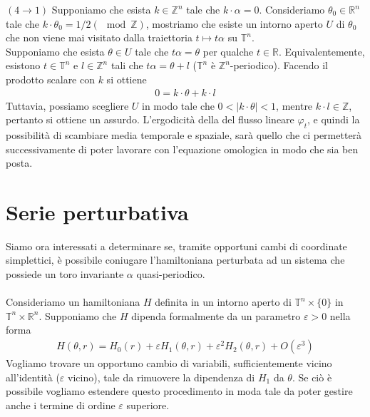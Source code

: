 \documentclass[twoside, 11pt]{amsbook}
\makeatletter
\newcommand{\0}{{(0)}}
\newcommand{\3}{{(3)}}
\theoremstyle{colonplain}
\theoremstyle{colondefinition}
\theoremstyle{colonremark}
\numberwithin{equation}{chapter}
\renewcommand{\proofname}{Dimostrazione}
\renewenvironment{proof}[1][\proofname]{\par
  \pushQED{\qed}%
  \normalfont \topsep6\p@\@plus6\p@\relax
  \trivlist
  \item[\hskip\labelsep\bfseries #1:]\ignorespaces
}{%
  \popQED\endtrivlist\@endpefalse
}
\makeatother
\begin{document}
\begin{proof}
$(4 \rightarrow 1)$ Supponiamo che esista $k \in \mathbb{Z}^n$ tale che $k \cdot \alpha = 0$. Consideriamo $\theta_0 \in \mathbb{R}^n$ tale che $k \cdot \theta_0 = 1/2 (\mod \mathbb{Z})$, mostriamo che esiste un intorno aperto $U$ di $\theta_0$ che non viene mai visitato dalla traiettoria $t \mapsto t\alpha$ su $\mathbb{T}^n$. \\
Supponiamo che esista $\theta \in U$ tale che $t\alpha = \theta$ per qualche $t \in \mathbb{R}$. Equivalentemente, esistono $t \in \mathbb{T}^n$ e $l \in \mathbb{Z}^n$ tali che $t\alpha = \theta + l$ ($\mathbb{T}^n$ è $\mathbb{Z}^n$-periodico). Facendo il prodotto scalare con $k$ si ottiene
\begin{align}
    0 = k \cdot \theta + k \cdot l
\end{align}
Tuttavia, possiamo scegliere $U$ in modo tale che $0 < |k \cdot \theta| < 1$, mentre $k \cdot l \in \mathbb{Z}$, pertanto si ottiene un assurdo.
\end{proof}
L'ergodicità della del flusso lineare $\varphi_t$, e quindi la possibilità di scambiare media temporale e spaziale, sarà quello che ci permetterà successivamente di poter lavorare con l'equazione omologica in modo che sia ben posta.

\section{Serie perturbativa}
Siamo ora interessati a determinare se, tramite opportuni cambi di coordinate simplettici, è possibile coniugare l'hamiltoniana perturbata ad un sistema che possiede un toro invariante $\alpha$ quasi-periodico. \\ \\
Consideriamo un hamiltoniana $H$ definita in un intorno aperto di $\mathbb{T}^n \times \{0\}$ in $\mathbb{T}^n \times \mathbb{R}^n$. Supponiamo che $H$ dipenda formalmente da un parametro $\varepsilon > 0$ nella forma
\begin{align}\label{PertSeries}
    H(\theta, r) = H_0(r) + \varepsilon H_1(\theta, r) + \varepsilon^2H_2(\theta, r) + O(\varepsilon^3) 
\end{align}
Vogliamo trovare un opportuno cambio di variabili, sufficientemente vicino all'identità ($\varepsilon$ vicino), tale da rimuovere la dipendenza di $H_1$ da $\theta$. Se ciò è possibile vogliamo estendere questo procedimento in moda tale da poter gestire anche i termine di ordine $\varepsilon$ superiore.
\end{document}

